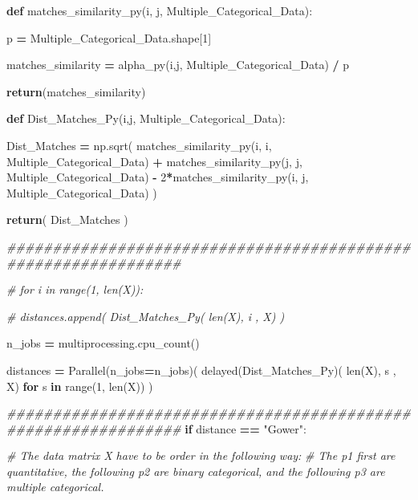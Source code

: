 \documentclass[
  11pt,
  a4paper,
]{article}
\newenvironment{Shaded}{\begin{snugshade}}{\end{snugshade}}
\newcommand{\BuiltInTok}[1]{#1}
\newcommand{\CommentTok}[1]{\textcolor[rgb]{0.56,0.35,0.01}{\textit{#1}}}
\newcommand{\ControlFlowTok}[1]{\textcolor[rgb]{0.13,0.29,0.53}{\textbf{#1}}}
\newcommand{\DecValTok}[1]{\textcolor[rgb]{0.00,0.00,0.81}{#1}}
\newcommand{\KeywordTok}[1]{\textcolor[rgb]{0.13,0.29,0.53}{\textbf{#1}}}
\newcommand{\NormalTok}[1]{#1}
\newcommand{\OperatorTok}[1]{\textcolor[rgb]{0.81,0.36,0.00}{\textbf{#1}}}
\newcommand{\StringTok}[1]{\textcolor[rgb]{0.31,0.60,0.02}{#1}}
\begin{document}
\begin{Shaded}
\begin{Highlighting}[]
        \KeywordTok{def}\NormalTok{ matches\_similarity\_py(i, j, Multiple\_Categorical\_Data):}

\NormalTok{            p }\OperatorTok{=}\NormalTok{ Multiple\_Categorical\_Data.shape[}\DecValTok{1}\NormalTok{]}

\NormalTok{            matches\_similarity }\OperatorTok{=}\NormalTok{ alpha\_py(i,j, Multiple\_Categorical\_Data) }\OperatorTok{/}\NormalTok{ p}

            \ControlFlowTok{return}\NormalTok{(matches\_similarity)}


        \KeywordTok{def}\NormalTok{ Dist\_Matches\_Py(i,j, Multiple\_Categorical\_Data):}

\NormalTok{            Dist\_Matches }\OperatorTok{=}\NormalTok{ np.sqrt( matches\_similarity\_py(i, i, Multiple\_Categorical\_Data) }\OperatorTok{+}\NormalTok{  matches\_similarity\_py(j, j, Multiple\_Categorical\_Data) }\OperatorTok{{-}} \DecValTok{2}\OperatorTok{*}\NormalTok{matches\_similarity\_py(i, j, Multiple\_Categorical\_Data) )}

            \ControlFlowTok{return}\NormalTok{( Dist\_Matches )}

\CommentTok{\#\#\#\#\#\#\#\#\#\#\#\#\#\#\#\#\#\#\#\#\#\#\#\#\#\#\#\#\#\#\#\#\#\#\#\#\#\#\#\#\#\#\#\#\#\#\#\#\#\#\#\#\#\#\#\#\#\#\#\#\#\#\#}

        \CommentTok{\# for i in range(1, len(X)):}

          \CommentTok{\#  distances.append( Dist\_Matches\_Py( len(X), i , X) )}

\NormalTok{        n\_jobs  }\OperatorTok{=}\NormalTok{ multiprocessing.cpu\_count()}

\NormalTok{        distances }\OperatorTok{=}\NormalTok{ Parallel(n\_jobs}\OperatorTok{=}\NormalTok{n\_jobs)( delayed(Dist\_Matches\_Py)( }\BuiltInTok{len}\NormalTok{(X), s , X) }\ControlFlowTok{for}\NormalTok{ s }\KeywordTok{in} \BuiltInTok{range}\NormalTok{(}\DecValTok{1}\NormalTok{, }\BuiltInTok{len}\NormalTok{(X)) )}

\CommentTok{\#\#\#\#\#\#\#\#\#\#\#\#\#\#\#\#\#\#\#\#\#\#\#\#\#\#\#\#\#\#\#\#\#\#\#\#\#\#\#\#\#\#\#\#\#\#\#\#\#\#\#\#\#\#\#\#\#\#\#\#\#\#\#   }
    \ControlFlowTok{if}\NormalTok{ distance }\OperatorTok{==} \StringTok{"Gower"}\NormalTok{:}

        \CommentTok{\# The data matrix X have to be order in the following way:}
        \CommentTok{\# The p1 first are quantitative, the following p2 are binary categorical, and the following p3 are multiple categorical.}




\end{Highlighting}
\end{Shaded}
\end{document}
